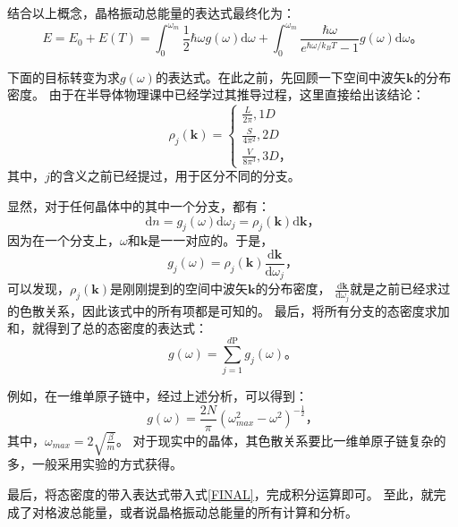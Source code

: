 \documentclass[declarePage]{ecnuthesis}
\begin{document}
结合以上概念，晶格振动总能量的表达式最终化为：
\begin{equation}
    E = E_0 + E(T) = \int_{0}^{\omega_m} \frac{1}{2}\hbar \omega g(\omega) \mathrm{d}\omega + \int_{0}^{\omega_m} \frac{\hbar \omega}{e^{\hbar \omega / k_B T}-1} g(\omega) \mathrm{d}\omega \text{。} \label{FINAL}
\end{equation}

下面的目标转变为求$g(\omega)$的表达式。在此之前，先回顾一下空间中波矢$\mathbf{k}$的分布密度。%
由于在半导体物理课中已经学过其推导过程，这里直接给出该结论：
\begin{equation}
    \rho_j(\mathbf{k}) = 
    \begin{cases}
        \frac{L}{2\pi  },1D\\
        \frac{S}{4\pi^2},2D\\
        \frac{V}{8\pi^3},3D \text{，}
    \end{cases}
\end{equation}
其中，$j$的含义之前已经提过，用于区分不同的分支。

显然，对于任何晶体中的其中一个分支，都有：
\begin{equation}
   \mathrm{d}n = g_j(\omega) \mathrm{d} \omega_j = \rho_j (\mathbf{k}) \mathrm{d} \mathbf{k} \text{，}
\end{equation}
因为在一个分支上，$\omega$和$\mathbf{k}$是一一对应的。于是，
\begin{equation}
    g_j(\omega) = \rho_j(\mathbf{k}) \frac{\mathrm{d} \mathbf{k}}{\mathrm{d} \omega_j} \text{，}
\end{equation}
可以发现，$\rho_j(\mathbf{k})$是刚刚提到的空间中波矢$\mathbf{k}$的分布密度，%
$\frac{\mathrm{d} \mathbf{k}}{\mathrm{d} \omega_j}$就是之前已经求过的色散关系，因此该式中的所有项都是可知的。
最后，将所有分支的态密度求加和，就得到了总的态密度的表达式：
\begin{equation}
    g(\omega) = \sum_{j=1}^{d \mathrm{P}}g_j(\omega) \text{。}
\end{equation}

例如，在一维单原子链中，经过上述分析，可以得到：
\begin{equation}
    g(\omega) = \frac{2N}{\pi}(\omega_{max}^2-\omega^2)^{-\frac{1}{2}} \text{，}
\end{equation}
其中，$\omega_{max}=2\sqrt{\frac{\beta}{m}}$。%
对于现实中的晶体，其色散关系要比一维单原子链复杂的多，一般采用实验的方式获得。

最后，将态密度的带入表达式带入式\ref{FINAL}，完成积分运算即可。%
至此，就完成了对格波总能量，或者说晶格振动总能量的所有计算和分析。
\end{document}

